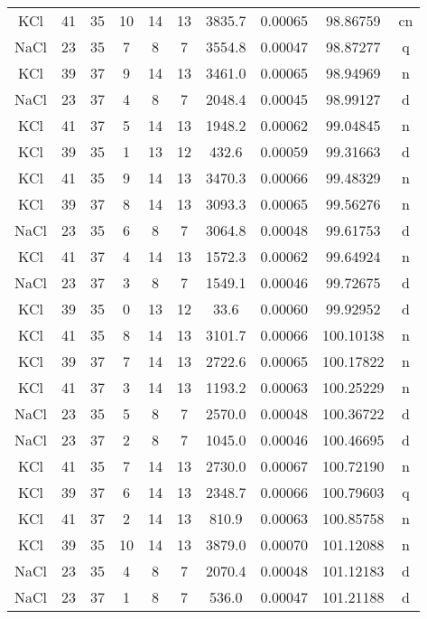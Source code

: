 \begin{table*}[htp]
\begin{tabular}{cccccccccc}
KCl & 41 & 35 & 10 & 14 & 13 & 3835.7 & 0.00065 & 98.86759 & cn \\
NaCl & 23 & 35 & 7 & 8 & 7 & 3554.8 & 0.00047 & 98.87277 & q \\
KCl & 39 & 37 & 9 & 14 & 13 & 3461.0 & 0.00065 & 98.94969 & n \\
NaCl & 23 & 37 & 4 & 8 & 7 & 2048.4 & 0.00045 & 98.99127 & d \\
KCl & 41 & 37 & 5 & 14 & 13 & 1948.2 & 0.00062 & 99.04845 & n \\
KCl & 39 & 35 & 1 & 13 & 12 & 432.6 & 0.00059 & 99.31663 & d \\
KCl & 41 & 35 & 9 & 14 & 13 & 3470.3 & 0.00066 & 99.48329 & n \\
KCl & 39 & 37 & 8 & 14 & 13 & 3093.3 & 0.00065 & 99.56276 & n \\
NaCl & 23 & 35 & 6 & 8 & 7 & 3064.8 & 0.00048 & 99.61753 & d \\
KCl & 41 & 37 & 4 & 14 & 13 & 1572.3 & 0.00062 & 99.64924 & n \\
NaCl & 23 & 37 & 3 & 8 & 7 & 1549.1 & 0.00046 & 99.72675 & d \\
KCl & 39 & 35 & 0 & 13 & 12 & 33.6 & 0.00060 & 99.92952 & d \\
KCl & 41 & 35 & 8 & 14 & 13 & 3101.7 & 0.00066 & 100.10138 & n \\
KCl & 39 & 37 & 7 & 14 & 13 & 2722.6 & 0.00065 & 100.17822 & n \\
KCl & 41 & 37 & 3 & 14 & 13 & 1193.2 & 0.00063 & 100.25229 & n \\
NaCl & 23 & 35 & 5 & 8 & 7 & 2570.0 & 0.00048 & 100.36722 & d \\
NaCl & 23 & 37 & 2 & 8 & 7 & 1045.0 & 0.00046 & 100.46695 & d \\
KCl & 41 & 35 & 7 & 14 & 13 & 2730.0 & 0.00067 & 100.72190 & n \\
KCl & 39 & 37 & 6 & 14 & 13 & 2348.7 & 0.00066 & 100.79603 & q \\
KCl & 41 & 37 & 2 & 14 & 13 & 810.9 & 0.00063 & 100.85758 & n \\
KCl & 39 & 35 & 10 & 14 & 13 & 3879.0 & 0.00070 & 101.12088 & n \\
NaCl & 23 & 35 & 4 & 8 & 7 & 2070.4 & 0.00048 & 101.12183 & d \\
NaCl & 23 & 37 & 1 & 8 & 7 & 536.0 & 0.00047 & 101.21188 & d \\
\hline
\end{tabular}

\par 
\end{table*}

